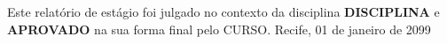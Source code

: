 % 
\begin{folhadeaprovacao}
  \begin{center}
    {\ABNTEXchapterfont\large\imprimirautor}
    \vspace*{\fill}\vspace*{\fill}
    \begin{center}
      \ABNTEXchapterfont\bfseries\Large\imprimirtitulo
    \end{center}
    \vspace*{\fill}
    Este relatório de estágio foi julgado no contexto da disciplina \textbf{DISCIPLINA} e \textbf{APROVADO} na sua forma final pelo CURSO.
    \vspace*{\fill}
    Recife, 01 de janeiro de 2099
  \end{center}

\makeatother
\end{folhadeaprovacao}

